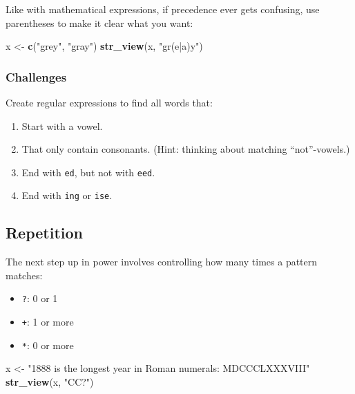 \documentclass[]{book}
\newenvironment{Shaded}{\begin{snugshade}}{\end{snugshade}}
\newcommand{\KeywordTok}[1]{\textcolor[rgb]{0.13,0.29,0.53}{\textbf{#1}}}
\newcommand{\NormalTok}[1]{#1}
\newcommand{\StringTok}[1]{\textcolor[rgb]{0.31,0.60,0.02}{#1}}
\providecommand{\tightlist}{%
  \setlength{\itemsep}{0pt}\setlength{\parskip}{0pt}}
\begin{document}
Like with mathematical expressions, if precedence ever gets confusing, use parentheses to make it clear what you want:

\begin{Shaded}
\begin{Highlighting}[]
\NormalTok{x <-}\StringTok{ }\KeywordTok{c}\NormalTok{(}\StringTok{"grey"}\NormalTok{, }\StringTok{"gray"}\NormalTok{)}
\KeywordTok{str_view}\NormalTok{(x, }\StringTok{"gr(e|a)y"}\NormalTok{)}
\end{Highlighting}
\end{Shaded}

\hypertarget{htmlwidget-3f27c09be0c60bb52829}{}

\hypertarget{challenges-16}{%
\subsubsection*{Challenges}\label{challenges-16}}

Create regular expressions to find all words that:

\begin{enumerate}
\def\labelenumi{\arabic{enumi}.}
\item
  Start with a vowel.
\item
  That only contain consonants. (Hint: thinking about matching
  ``not''-vowels.)
\item
  End with \texttt{ed}, but not with \texttt{eed}.
\item
  End with \texttt{ing} or \texttt{ise}.
\end{enumerate}

\hypertarget{repetition}{%
\subsection{Repetition}\label{repetition}}

The next step up in power involves controlling how many times a pattern matches:

\begin{itemize}
\tightlist
\item
  \texttt{?}: 0 or 1
\item
  \texttt{+}: 1 or more
\item
  \texttt{*}: 0 or more
\end{itemize}

\begin{Shaded}
\begin{Highlighting}[]
\NormalTok{x <-}\StringTok{ "1888 is the longest year in Roman numerals: MDCCCLXXXVIII"}
\KeywordTok{str_view}\NormalTok{(x, }\StringTok{"CC?"}\NormalTok{)}
\end{Highlighting}
\end{Shaded}
\end{document}
